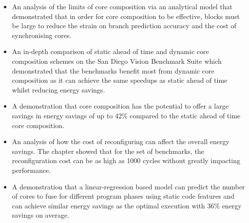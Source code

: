 \begin{itemize}
\item An analysis of the limits of core composition via an analytical model that demonstrated that in order for core composition to be effective, blocks must be large to reduce the strain on branch prediction accuracy and the cost of synchronising cores.
\vspace{-0.5em}
\item An in-depth comparison of static ahead of time and dynamic core composition schemes on the San Diego Vision Benchmark Suite which demonstrated that the benchmarks benefit most from dynamic core composition as it can achieve the same speedups as static ahead of time whilst reducing energy savings.
\vspace{-0.5em}
\item A demonstration that core composition has the potential to offer a large savings in energy savings of up to 42\% compared to the static ahead of time core composition.
\vspace{-0.5em}
\item An analysis of how the cost of reconfiguring can affect the overall energy savings. The chapter showed that for the set of benchmarks, the reconfiguration cost can be as high as 1000 cycles without greatly impacting performance.
\vspace{-0.5em}
\item A demonstration that a linear-regression based model can predict the number of cores to fuse for different program phases using static code features and can achieve similar energy savings as the optimal execution with 36\% energy savings on average.
\end{itemize} 




